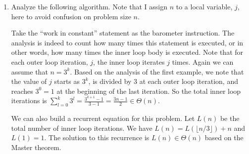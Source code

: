 \documentclass[10pt]{article}
\begin{document}
\begin{enumerate}
\item Analyze the following algorithm. Note that I assign $n$ to a local
  variable, $j$,  here to avoid confusion on problem size $n$.

\begin{figure}[h]
\begin{center}
\begin{minipage}{7cm}
    \leavevmode
    
\end{minipage}
\end{center}
\end{figure}

Take the ``work in constant'' statement as the barometer instruction. The
analysis is indeed to count how many times this statement is executed, or in
other words, how many times the inner loop body is executed. Note that for
each outer loop iteration, $j$, the inner loop iterates $j$ times. Again we
can assume that $n = 3^k$. Based on the analysis of the first example, we note
that the value of $j$ starts as $3^k$, is divided by 3 at each outer loop
iteration, and reaches $3^0=1$ at the beginning of the last iteration. So the
total inner loop iterations is
$\sum_{l=0}^{k}3^{l}=\frac{3^{k+1}-1}{3-1}=\frac{3n-1}{2} \in \Theta(n)$.

We can also build a recurrent equation for this problem. Let $L(n)$ be
the total number of inner loop iterations. We have $L(n) = L(\lfloor n/3
\rfloor) + n$ and $L(1) = 1$. The solution to this recurrence is $L(n) \in
\Theta(n)$ based on the Master theorem.

\end{enumerate}
\end{document}
